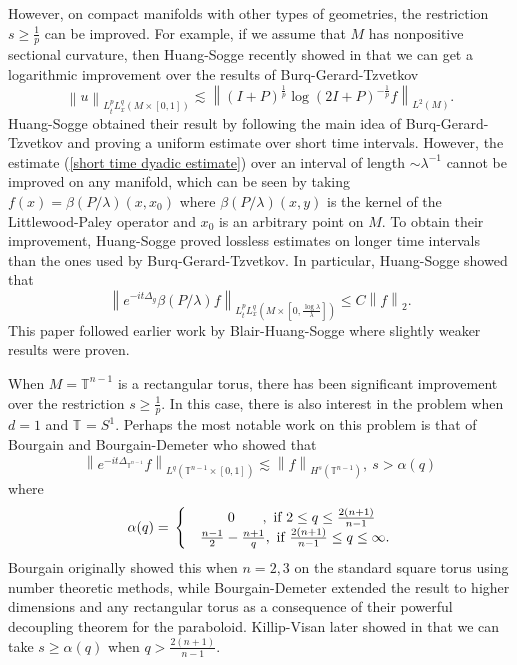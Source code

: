 \documentclass[11pt]{amsart}
\numberwithin{equation}{section}
\newcommand{\Tn}{\mathbb{T}^{n-1}}
\newcommand{\la}{\lambda}
\newcommand\norm[1]{\left\lVert#1\right\rVert}
\newcommand{\lpnorm}[3]{\norm{#1}_{L^{#2}(#3)}}
\newcommand{\altlpnorm}[2]{\norm{#1}_{#2}}
\newcommand{\mixlpnorm}[4]{\norm{#1}_{L^{#2}_{t} L^{#3}_{x}(#4)}}
\newcommand{\T}[1][]{\mathbb{T}^#1}
\newcommand{\laplac}[1]{\Delta_{#1}}
\begin{document}
However, on compact manifolds with other types of geometries, the restriction $s \geq \frac{1}{p}$ can be improved. For example, if we assume that $M$ has nonpositive sectional curvature, then Huang-Sogge recently showed in \cite{HuangSoggeStrichartz} that we can get a logarithmic improvement over the results of Burq-Gerard-Tzvetkov
\begin{equation} \label{Huang-Sogge Strichartz}
    \mixlpnorm{u}{p}{q}{M \times [0,1]} \lesssim \lpnorm{(I+P)^{\frac{1}{p}}\log{(2I+P)}^{-\frac{1}{p}}f}{2}{M}.
\end{equation}
Huang-Sogge obtained their result by following the main idea of Burq-Gerard-Tzvetkov and proving a uniform estimate over short time intervals. However, the estimate (\ref{short time dyadic estimate}) over an interval of length $\sim \la^{-1}$ cannot be improved on any manifold, which can be seen by taking $f(x) = \beta(P/\la)(x,x_0)$ where $\beta(P/\la)(x,y)$ is the kernel of the Littlewood-Paley operator and $x_0$ is an arbitrary point on $M$. To obtain their improvement, Huang-Sogge proved lossless estimates on longer time intervals than the ones used by Burq-Gerard-Tzvetkov. In particular, Huang-Sogge showed that
\begin{equation} \label{Huang-Sogge small time Strichartz}
    \mixlpnorm{e^{-it\laplac{g}}\beta(P / \la)f}{p}{q}{M \times [0,\frac{\log\la}{\la}]} \leq C \altlpnorm{f}{2}.
\end{equation}
This paper followed earlier work by Blair-Huang-Sogge  \cite{BlairHuangSoggeStrichartz} where slightly weaker results were proven.

When $M = \Tn$ is a rectangular torus, there has been significant improvement over the restriction $s \geq \frac{1}{p}$. In this case, there is also interest in the problem when $d = 1$ and $\T{} = S^{1}$.  Perhaps the most notable work on this problem is that of Bourgain \cite{bourgain1993strichartzI} and Bourgain-Demeter \cite{BourgainDemeter2015} who showed that
\begin{equation} \label{strichartz torus}
    \lpnorm{e^{-it\laplac{\Tn}}f}{q}{\Tn \times [0,1]} \lesssim \norm{f}_{H^s(\Tn)}, \ s > \alpha(q)
\end{equation}
where 
\begin{equation}
    \alpha(q) = \\
    \begin{cases}

    & \ \ \ \ \ \ 0 \ \ \ \ \ \  ,   \ \text{if } 2 \leq q \leq \frac{2(n+1)}{n-1} \\ 
    
    &\frac{n-1}{2} - \frac{n+1}{q}, \ \text{if }  \frac{2(n+1)}{n-1} \leq q \leq \infty.

    \end{cases} 
\end{equation}
Bourgain originally showed this when $n = 2, 3$ on the standard square torus using number theoretic methods, while Bourgain-Demeter extended the result to higher dimensions and any rectangular torus as a consequence of their powerful decoupling theorem for the paraboloid. Killip-Visan later showed in \cite{KillipVisanStrichartz} that we can take $s \geq \alpha(q)$ when $q > \frac{2(n+1)}{n-1}$.
\end{document}
